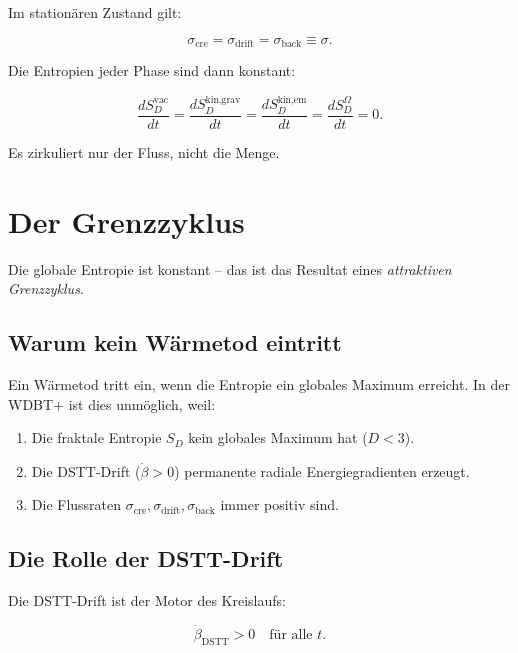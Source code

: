 Im stationären Zustand gilt:

\begin{equation}
\sigma_{\text{cre}} = \sigma_{\text{drift}} = \sigma_{\text{back}} \equiv \sigma. \tag{3.5}
\end{equation}

Die Entropien jeder Phase sind dann konstant:

\begin{equation}
\frac{dS_D^{\text{vac}}}{dt} = \frac{dS_D^{\text{kin,grav}}}{dt} = \frac{dS_D^{\text{kin,em}}}{dt} = \frac{dS_D^{\Omega}}{dt} = 0. \tag{3.6}
\end{equation}

Es zirkuliert nur der Fluss, nicht die Menge.

\section{Der Grenzzyklus}

Die globale Entropie ist konstant – das ist das Resultat eines \emph{attraktiven Grenzzyklus}.

\subsection{Warum kein Wärmetod eintritt}

Ein Wärmetod tritt ein, wenn die Entropie ein globales Maximum erreicht. In der WDBT+ ist dies unmöglich, weil:

\begin{enumerate}
    \item Die fraktale Entropie \(S_D\) kein globales Maximum hat (\(D < 3\)).
    \item Die DSTT-Drift (\( \dot{\beta} > 0 \)) permanente radiale Energiegradienten erzeugt.
    \item Die Flussraten \( \sigma_{\text{cre}}, \sigma_{\text{drift}}, \sigma_{\text{back}} \) immer positiv sind.
\end{enumerate}

\subsection{Die Rolle der DSTT-Drift}

Die DSTT-Drift ist der Motor des Kreislaufs:

\begin{equation}
\dot{\beta}_{\text{DSTT}} > 0 \quad \text{für alle } t. \tag{3.7}
\end{equation}

